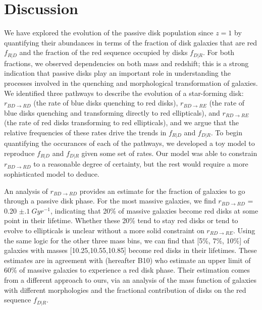 \documentclass[useAMS,usenatbib]{mn2e}
\begin{document}


\section{Discussion}
\label{sec:Discussion}

We have explored the evolution of the passive disk population since $z=1$ by quantifying their abundances in terms of the fraction of disk galaxies that are red $f_{R|D}$ and the fraction of the red sequence occupied by disks $f_{D|R}$. For both fractions, we observed dependencies on both mass and redshift; this is a strong indication that passive disks play an important role in understanding the processes involved in the quenching and morphological transformation of galaxies. We identified three pathways to describe the evolution of a star-forming disk: $r_{BD \rightarrow RD}$ (the rate of blue disks quenching to red disks), $r_{BD \rightarrow RE}$ (the rate of blue disks quenching and transforming directly to red ellipticals), and $r_{RD \rightarrow RE}$ (the rate of red disks transforming to red ellipticals), and we argue that the relative frequencies of these rates drive the trends in $f_{R|D}$ and $f_{D|R}$. To begin quantifying the occurances of each of the pathways, we developed a toy model to reproduce $f_{R|D}$ and $f_{D|R}$ given some set of rates. Our model was able to constrain $r_{BD \rightarrow RD}$ to a reasonable degree of certainty, but the rest would require a more sophisticated model to deduce.

An analysis of $r_{BD \rightarrow RD}$ provides an estimate for the fraction of galaxies to go through a passive disk phase. For the most massive galaxies, we find $r_{BD \rightarrow RD}$ = 0.20 $\pm .1~Gyr^{-1}$, indicating that 20\% of massive galaxies become red disks at some point in their lifetime. Whether these 20\% tend to stay red disks or tend to evolve to ellipticals is unclear without a more solid constraint on $r_{RD \rightarrow RE}$. Using the same logic for the other three mass bins, we can find that [5\%, 7\%, 10\%] of galaxies with masses [10.25,10.55,10.85] become red disks in their lifetimes. These estimates are in agreement with \citet{Bundy2010} (hereafter B10) who estimate an upper limit of 60\% of massive galaxies to experience a red disk phase. Their estimation comes from a different approach to ours, via an analysis of the mass function of galaxies with different morphologies and the fractional contribution of disks on the red sequence $f_{D|R}$.  
\end{document}
